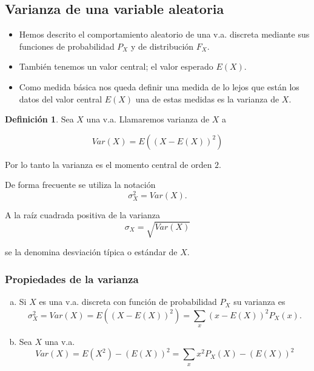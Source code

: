 \documentclass[handout]{beamer}\usepackage[]{graphicx}\usepackage[]{color}
\renewcommand{\emph}[1]{{\color{red}#1}}
\theoremstyle{plain}
\theoremstyle{definition}
\newtheorem{definicion}{Definición}
\begin{document}
\subsection{Varianza de una variable aleatoria}

\begin{frame}


\begin{itemize}
\item Hemos descrito el comportamiento aleatorio de una v.a. discreta mediante sus funciones  de probabilidad $P_{X}$ y de distribución $F_{X}$.
\item También tenemos un valor central; el valor esperado $E(X)$. 
\item Como medida básica nos queda definir una medida de lo lejos que están los datos del valor central $E(X)$ una de estas medidas es la varianza de $X$.
\end{itemize}
\end{frame}

\begin{frame}
\begin{definicion}
    Sea $X$ una v.a. Llamaremos \emph{varianza} de $X$ a

    $$Var(X)=E((X-E(X))^2)$$
\end{definicion}

Por lo tanto la varianza es el momento
      central de orden $2$.

    De forma frecuente se utiliza la notación $$\sigma_{X}^2=Var(X).$$
    
    A la raíz cuadrada positiva de la varianza
   $$\sigma_{X}=\sqrt{Var(X)}$$
   
   se la denomina desviación típica  o estándar de $X$.
\end{frame}

\begin{frame}

\frametitle{Propiedades de la varianza}
\begin{enumerate}[a)]
\item Si $X$ es una v.a. discreta con función de probabilidad $P_X$ su varianza es 
 $$\sigma_{X}^2=Var(X)=E((X-E(X))^2)=\sum_{x}(x-E(X))^2 P_{X}(x).$$
\item Sea $X$ una v.a.
 $$Var(X)=E(X^2)-(E(X))^2=\sum_{x} x^2 P_{X}(X)-(E(X))^2$$
\end{enumerate}
\end{frame}
\end{document}
